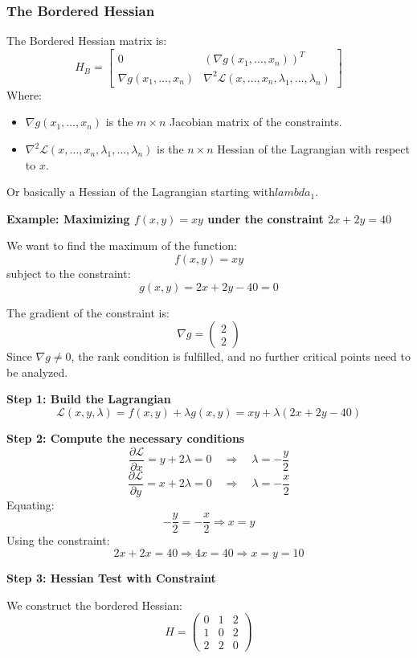 \subsubsection{The Bordered Hessian}
The Bordered Hessian matrix is:
\[
H_B =
\begin{bmatrix}
0 & \left( \nabla g(x_1, \dots, x_n) \right)^T \\
\nabla g(x_1, \dots, x_n) & \nabla^2 \mathcal{L}(x, \dots, x_n, \lambda_1, \dots, \lambda_n)
\end{bmatrix}
\]
Where:
\begin{itemize}[label=\(-\)]
  \item \( \nabla  g(x_1, \dots, x_n) \) is the \( m \times n \) Jacobian matrix of the constraints.
  \item \( \nabla^2 \mathcal{L}(x, \dots, x_n, \lambda_1, \dots, \lambda_n) \) is the \( n \times n \) Hessian of the Lagrangian with respect to \( x \).
\end{itemize}

Or basically a Hessian of the Lagrangian starting with\(lambda_1\).

\textbf{Example: Maximizing \( f(x, y) = xy \) under the constraint \( 2x + 2y = 40 \)}

We want to find the maximum of the function:
\[
f(x, y) = xy
\]
subject to the constraint:
\[
g(x, y) = 2x + 2y - 40 = 0
\]

The gradient of the constraint is:
\[
\nabla g = \begin{pmatrix} 2 \\ 2 \end{pmatrix}
\]
Since \( \nabla g \ne 0 \), the rank condition is fulfilled, and no further critical points need to be analyzed.

\textbf{Step 1: Build the Lagrangian}
\[
\mathcal{L}(x, y, \lambda) = f(x, y) + \lambda g(x, y) = xy + \lambda (2x + 2y - 40)
\]

\textbf{Step 2: Compute the necessary conditions}
\[
\frac{\partial \mathcal{L}}{\partial x} = y + 2\lambda = 0 \quad \Rightarrow \quad \lambda = -\frac{y}{2}
\]
\[
\frac{\partial \mathcal{L}}{\partial y} = x + 2\lambda = 0 \quad \Rightarrow \quad \lambda = -\frac{x}{2}
\]
Equating:
\[
-\frac{y}{2} = -\frac{x}{2} \Rightarrow x = y
\]
Using the constraint:
\[
2x + 2x = 40 \Rightarrow 4x = 40 \Rightarrow x = y = 10
\]

\textbf{Step 3: Hessian Test with Constraint}

We construct the bordered Hessian:
\[
H = \begin{pmatrix}
0 & 1 & 2 \\
1 & 0 & 2 \\
2 & 2 & 0
\end{pmatrix}
\]

